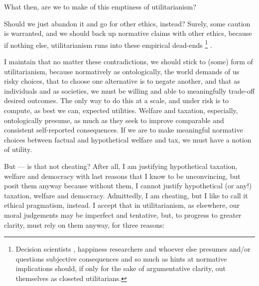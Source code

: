 What then, are we to make of this emptiness of utilitarianism?

Should we just abandon it and go for other ethics, instead? Surely, some caution is warranted, and we should back up normative claims with other ethics, because if nothing else, utilitarianism runs into these empirical dead-ends
\footnote{
	Decision scientists \citep[for example,][]{Kahneman2011}, happiness researchers \citep[for example,][]{Veenhoven-2000-aa} and whoever else presumes and/or questions subjective consequences and so much as hints at normative implications should, if only for the sake of argumentative clarity, out themselves as closeted utilitarians.
}
.

I maintain that no matter these contradictions, we should stick to (some) form of utilitarianism, because normatively as ontologically, the world demands of us risky choices, that to choose one alternative is to negate another, and that as individuals and as societies, we must be willing and able to meaningfully trade-off desired outcomes. 
The only way to do this at a scale, and under risk is to compute, as best we can, expected utilities.
Welfare and taxation, especially, ontologically presume, as much as they seek to improve comparable and consistent self-reported consequences.
If we are to make meaningful normative choices between factual and hypothetical welfare and tax, we must have a notion of utility.

But --- is that not cheating? %
After all, I am justifying hypothetical taxation, welfare and democracy with last reasons that I know to be unconvincing, but posit them anyway because without them, I cannot justify hypothetical (or any!) taxation, welfare and democracy. 
Admittedly, I am cheating, but I like to call it ethical pragmatism, instead.
I accept that in utilitarianism, as elsewhere, our moral judgements may be imperfect and tentative, but, to progress to greater clarity, must rely on them anyway, for three reasons:

